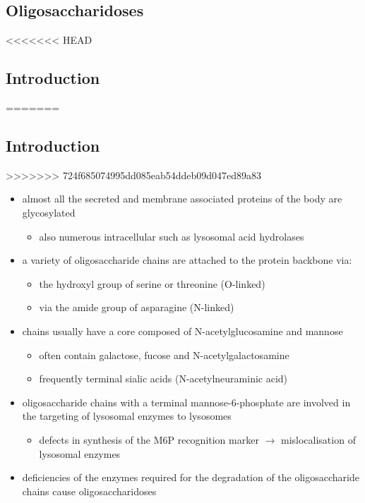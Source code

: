 \documentclass[fontsize=12pt]{scrartcl}
\begin{document}
\begin{enumerate}
\begin{enumerate}
\begin{enumerate}
\begin{enumerate}
\begin{table}[htbp]
\begin{enumerate}
\begin{enumerate}
\begin{enumerate}
\begin{enumerate}
\section{Oligosaccharidoses}
<<<<<<< HEAD
\label{sec:org2060ed9}
\subsection{Introduction}
\label{sec:orgf430816}
=======
\label{sec:org5857799}
\subsection{Introduction}
\label{sec:org73919a8}
>>>>>>> 724f685074995dd085eab54ddeb09d047ed89a83

\begin{itemize}
\item almost all the secreted and membrane associated proteins of the body
are glycosylated
\begin{itemize}
\item also numerous intracellular such as lysosomal acid hydrolases
\end{itemize}
\item a variety of oligosaccharide chains are attached to the protein
backbone via:
\begin{itemize}
\item the hydroxyl group of serine or threonine (O-linked)
\item via the amide group of asparagine (N-linked)
\end{itemize}

\item chains usually have a core composed of N-acetylglucosamine and mannose
\begin{itemize}
\item often contain galactose, fucose and N-acetylgalactosamine
\item frequently terminal sialic acids (N-acetylneuraminic acid)
\end{itemize}
\item oligosaccharide chains with a terminal mannose-6-phosphate are
involved in the targeting of lysosomal enzymes to lysosomes
\begin{itemize}
\item defects in synthesis of the M6P recognition marker \(\to\)
mislocalisation of lysosomal enzymes
\end{itemize}
\item deficiencies of the enzymes required for the degradation of the
oligosaccharide chains cause oligosaccharidoses
\end{itemize}




\end{enumerate}
\end{enumerate}
\end{enumerate}
\end{enumerate}
\end{table}
\end{enumerate}
\end{enumerate}
\end{enumerate}
\end{enumerate}
\end{document}
